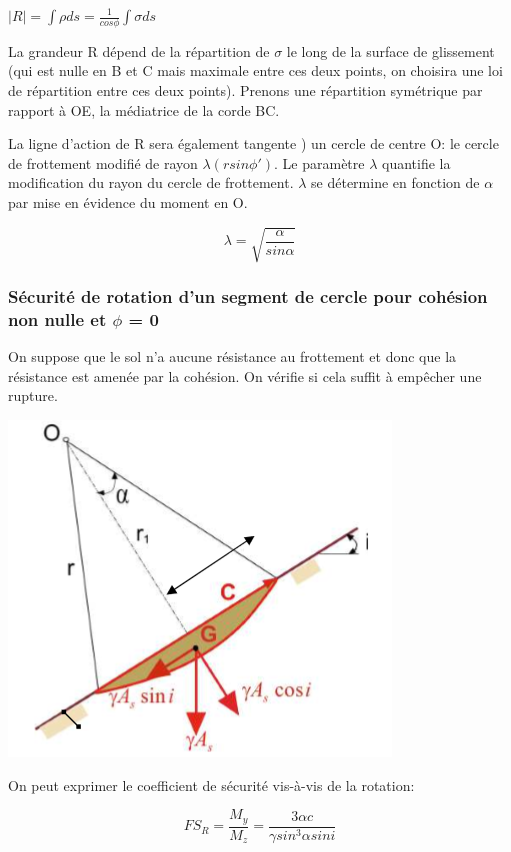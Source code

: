 $|R| = \int \rho ds = \frac{1}{cos \phi} \int \sigma ds $

La grandeur R dépend de la répartition de $\sigma$ le long de la surface de glissement (qui est nulle en B et C mais maximale entre ces deux points, on choisira une loi de répartition entre ces deux points). Prenons une répartition symétrique par rapport à OE, la médiatrice de la corde BC.

La ligne d'action de R sera également tangente ) un cercle de centre O: le cercle de frottement modifié de rayon $\lambda (r sin \phi')$. Le paramètre $\lambda$ quantifie la modification du rayon du cercle de frottement. $\lambda$ se détermine en fonction de $\alpha$ par mise en évidence du moment en O.

$$\lambda = \sqrt{\frac{\alpha}{sin \alpha}}$$

\subsubsection{Sécurité de rotation d'un segment de cercle pour cohésion non nulle et $\phi$ = 0}

On suppose que le sol n'a aucune résistance au frottement et donc que la résistance est amenée par la cohésion. On vérifie si cela suffit à empêcher une rupture.

\begin{center}
\includegraphics [scale=0.5]{pictures/ae.PNG}
\end{center}

On peut exprimer le coefficient de sécurité vis-à-vis de la rotation:

$$ FS_R = \frac{M_y}{M_z}=\frac{3 \alpha c}{\gamma sin^3\alpha sin i} $$ 

